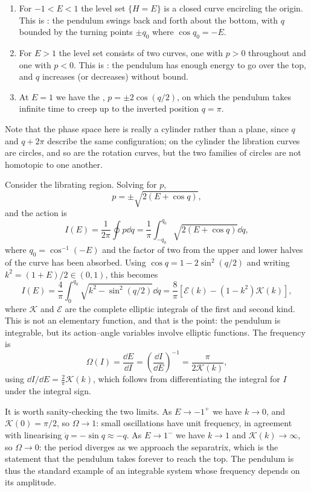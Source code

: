 \documentclass[a4paper]{scrartcl}
\begin{document}
\begin{example}
\begin{enumerate}[label=(\roman*)]
		\item For $-1 < E < 1$ the level set $\{H = E\}$ is a closed curve encircling the origin. This is : the pendulum swings back and forth about the bottom, with $q$ bounded by the turning points $\pm q_0$ where $\cos q_0 = -E$.
		\item For $E > 1$ the level set consists of two curves, one with $p > 0$ throughout and one with $p<0$. This is : the pendulum has enough energy to go over the top, and $q$ increases (or decreases) without bound.
		\item At $E = 1$ we have the , $p = \pm 2\cos(q/2)$, on which the pendulum takes infinite time to creep up to the inverted position $q = \pi$.
	\end{enumerate}
	Note that the phase space here is really a cylinder rather than a plane, since $q$ and $q + 2\pi$ describe the same configuration; on the cylinder the libration curves are circles, and so are the rotation curves, but the two families of circles are not homotopic to one another.

	Consider the librating region. Solving for $p$,
	$$
	p = \pm\sqrt{2(E + \cos q)},
	$$
	and the action is
	$$
	I(E) = \frac{1}{2\pi}\oint p \dd q = \frac{1}{\pi}\int_{-q_0}^{q_0}\sqrt{2(E+\cos q)}\dd q,
	$$
	where $q_0 = \cos^{-1}(-E)$ and the factor of two from the upper and lower halves of the curve has been absorbed. Using $\cos q = 1 - 2\sin^2(q/2)$ and writing $k^2 = (1+E)/2 \in (0,1)$, this becomes
	$$
	I(E) = \frac{4}{\pi}\int_0^{q_0}\sqrt{k^2 - \sin^2(q/2)}\dd q = \frac{8}{\pi}\left[\mathcal E(k) - (1-k^2)\mathcal K(k)\right],
	$$
	where $\mathcal K$ and $\mathcal E$ are the complete elliptic integrals of the first and second kind. This is not an elementary function, and that is the point: the pendulum is integrable, but its action--angle variables involve elliptic functions. The frequency is
	$$
	\Omega(I) = \frac{\dd E}{\dd I} = \left(\frac{\dd I}{\dd E}\right)^{-1} = \frac{\pi}{2\mathcal K(k)},
	$$
	using $\dd I/\dd E = \frac{2}{\pi}\mathcal{K}(k)$, which follows from differentiating the integral for $I$ under the integral sign.

	It is worth sanity-checking the two limits. As $E\to -1^+$ we have $k \to 0$, and $\mathcal K(0) = \pi/2$, so $\Omega\to 1$: small oscillations have unit frequency, in agreement with linearising $\ddot q = -\sin q \approx -q$. As $E\to 1^-$ we have $k\to 1$ and $\mathcal K(k)\to\infty$, so $\Omega\to 0$: the period diverges as we approach the separatrix, which is the statement that the pendulum takes forever to reach the top. The pendulum is thus the standard example of an integrable system whose frequency depends on its amplitude.
\end{example}
\end{document}
